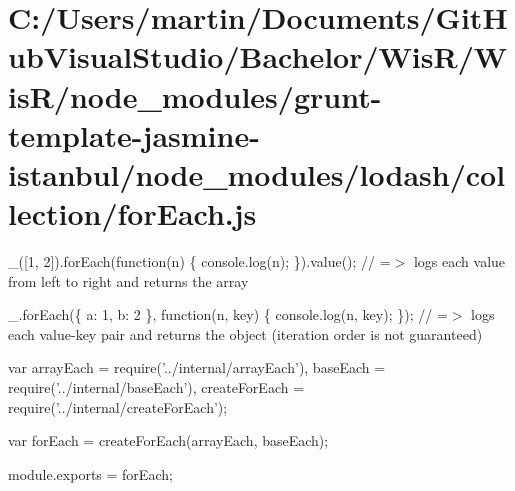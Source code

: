 \hypertarget{_c_1_2_users_2martin_2_documents_2_git_hub_visual_studio_2_bachelor_2_wis_r_2_wis_r_2node_modulea6e3a9f457749db77a43634873520462}{}\section{C\+:/\+Users/martin/\+Documents/\+Git\+Hub\+Visual\+Studio/\+Bachelor/\+Wis\+R/\+Wis\+R/node\+\_\+modules/grunt-\/template-\/jasmine-\/istanbul/node\+\_\+modules/lodash/collection/for\+Each.\+js}
\+\_\+(\mbox{[}1, 2\mbox{]}).for\+Each(function(n) \{ console.\+log(n); \}).value(); // =$>$ logs each value from left to right and returns the array

\+\_\+.\+for\+Each(\{ \textquotesingle{}a\textquotesingle{}\+: 1, \textquotesingle{}b\textquotesingle{}\+: 2 \}, function(n, key) \{ console.\+log(n, key); \}); // =$>$ logs each value-\/key pair and returns the object (iteration order is not guaranteed)


\begin{DoxyCodeInclude}
var arrayEach = require(\textcolor{stringliteral}{'../internal/arrayEach'}),
    baseEach = require(\textcolor{stringliteral}{'../internal/baseEach'}),
    createForEach = require(\textcolor{stringliteral}{'../internal/createForEach'});

var forEach = createForEach(arrayEach, baseEach);

module.exports = forEach;
\end{DoxyCodeInclude}
 